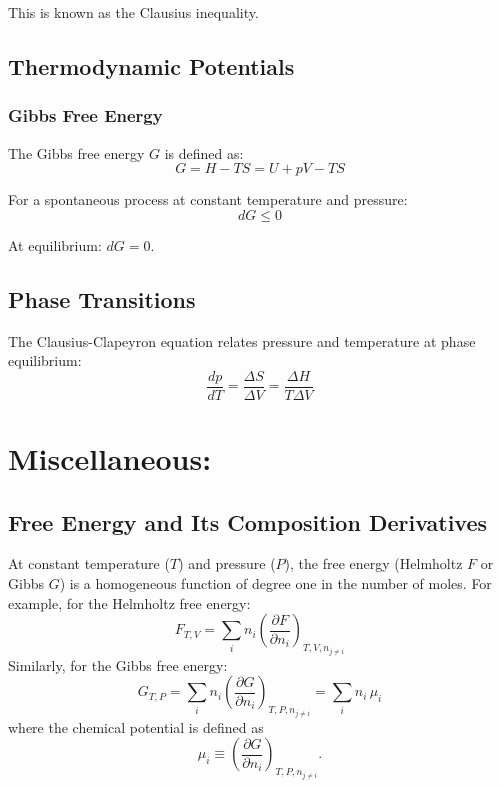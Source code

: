 \documentclass{article}
\theoremstyle{definition}
\begin{document}
This is known as the Clausius inequality.

\subsection{Thermodynamic Potentials}

\subsubsection{Gibbs Free Energy}

The Gibbs free energy $G$ is defined as:
\begin{equation}
G = H - TS = U + pV - TS
\end{equation}

For a spontaneous process at constant temperature and pressure:
\begin{equation}
dG \leq 0
\end{equation}

At equilibrium: $dG = 0$.

\subsection{Phase Transitions}

The Clausius-Clapeyron equation relates pressure and temperature at phase equilibrium:
\begin{equation}
\frac{dp}{dT} = \frac{\Delta S}{\Delta V} = \frac{\Delta H}{T \Delta V}
\end{equation}

\section{Miscellaneous:}

\subsection{Free Energy and Its Composition Derivatives}
At constant temperature (\(T\)) and pressure (\(P\)), the free energy (Helmholtz \(F\) or Gibbs \(G\)) is a homogeneous function of degree one in the number of moles. For example, for the Helmholtz free energy:
\begin{equation}
F_{T,V} = \sum_i n_i \left(\frac{\partial F}{\partial n_i}\right)_{T,V,n_{j\neq i}}
\end{equation}
Similarly, for the Gibbs free energy:
\begin{equation}
G_{T,P} = \sum_i n_i \left(\frac{\partial G}{\partial n_i}\right)_{T,P,n_{j\neq i}} = \sum_i n_i\,\mu_i
\end{equation}
where the chemical potential is defined as
\begin{equation}
\mu_i \equiv \left(\frac{\partial G}{\partial n_i}\right)_{T,P,n_{j\neq i}}.
\end{equation}
\end{document}
